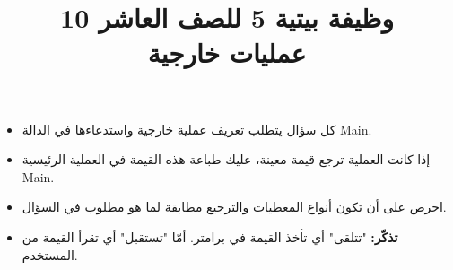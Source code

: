 ﻿\documentclass[12pt]{article}
\title{وظيفة بيتية 5 للصف العاشر 10 \\ عمليات خارجية}
\begin{document}
\maketitle
\thispagestyle{fancy}

\begin{boxCode}
    \begin{itemize}
        \item كل سؤال يتطلب تعريف عملية خارجية واستدعاءها في الدالة \textenglish{Main}.
        \item إذا كانت العملية ترجع قيمة معينة، عليك طباعة هذه القيمة في العملية الرئيسية \textenglish{Main}.
        \item احرص على أن تكون أنواع المعطيات والترجيع مطابقة لما هو مطلوب في السؤال.
        \item \textbf{تذكّر:} "تتلقى" أي تأخذ القيمة في برامتر. أمّا "تستقبل" أي تقرأ القيمة من المستخدم.
    \end{itemize}
\end{boxCode}
\end{document}

